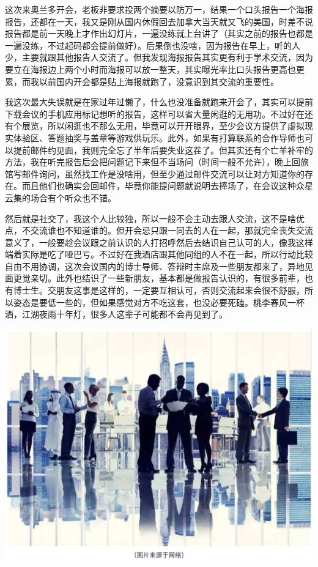 \documentclass[]{book}
\begin{document}
这次来奥兰多开会，老板非要求投两个摘要以防万一，结果一个口头报告一个海报报告，还都在一天，我又是刚从国内休假回去加拿大当天就又飞的美国，时差不说报告都是前一天晚上才作出幻灯片，一遍没练就上台讲了（其实之前的报告也都是一遍没练，不过起码都会提前做好）。后果倒也没啥，因为报告在早上，听的人少，主要就跟其他报告人交流了。但我发现海报报告其实更有利于学术交流，因为要立在海报边上两个小时而海报可以放一整天，其实曝光率比口头报告更高也更累，而我以前国内开会都是贴上海报就跑了，没意识到其交流的重要性。

我这次最大失误就是在家过年过懒了，什么也没准备就跑来开会了，其实可以提前下载会议的手机应用标记想听的报告，这样可以省大量闲逛的无用功。不过好在还有个展览，所以闲逛也不那么无用，毕竟可以开开眼界，至少会议方提供了虚拟现实体验区、答题抽奖与盖章等游戏供玩乐。此外，如果有打算联系的合作导师也可以提前邮件约见面，我则完全忘了半年后要失业这茬了。但其实还有个亡羊补牢的方法，我在听完报告后会把问题记下来但不当场问（时间一般不允许），晚上回旅馆写邮件询问，虽然找工作是没啥用，但至少通过邮件交流可以让对方知道你的存在。而且他们也确实会回邮件，毕竟你能提问题就说明去捧场了，在会议这种众星云集的场合有个听众也不错。

然后就是社交了，我这个人比较独，所以一般不会主动去跟人交流，这不是啥优点，不交流谁也不知道谁的。但开会忌只跟一同去的人在一起，那就完全丧失交流意义了，一般要趁会议跟之前认识的人打招呼然后去结识自己认可的人，像我这样端着实际是吃了哑巴亏。不过好在我酒店跟其他同组的人不在一起，所以行动比较自由不用协调，这次会议国内的博士导师、答辩时主席及一些朋友都来了，异地见面更觉亲切。此外也结识了一些新朋友，基本都是做报告认识的，有很多前辈，也有博士生。交朋友这事是这样的，一定要互相认可，否则交流起来会很不舒服，所以姿态是要低一些的，但如果感觉对方不吃这套，也没必要死磕。桃李春风一杯酒，江湖夜雨十年灯，很多人这辈子可能都不会再见到了。

\includegraphics[width=8.33in]{images/pittcon4}
\end{document}
